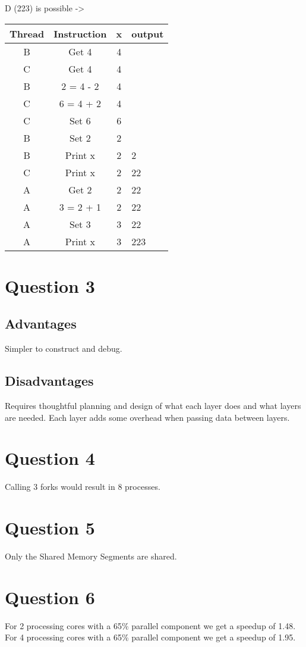 \documentclass{article}
\begin{document}
D (223) is possible ->

\begin{tabular}{c|c|c|l}
    Thread & Instruction & x & output \\
    \hline
    B      & Get 4       & 4 &        \\
    C      & Get 4       & 4 &        \\
    B      & 2 = 4 - 2   & 4 &        \\
    C      & 6 = 4 + 2   & 4 &        \\
    C      & Set 6       & 6 &        \\
    B      & Set 2       & 2 &        \\
    B      & Print x     & 2 & 2      \\
    C      & Print x     & 2 & 22     \\
    A      & Get 2       & 2 & 22     \\
    A      & 3 = 2 + 1   & 2 & 22     \\
    A      & Set 3       & 3 & 22     \\
    A      & Print x     & 3 & 223    \\
\end{tabular}

\section*{Question 3}
\subsection*{Advantages}
Simpler to construct and debug.

\subsection*{Disadvantages}
Requires thoughtful planning and design of what each layer does and what layers are needed.
Each layer adds some overhead when passing data between layers.

\section*{Question 4}
Calling 3 forks would result in 8 processes.

\section*{Question 5}
Only the Shared Memory Segments are shared.

\section*{Question 6}
For 2 processing cores with a 65\% parallel component we get a speedup of 1.48.
For 4 processing cores with a 65\% parallel component we get a speedup of 1.95.
\end{document}
